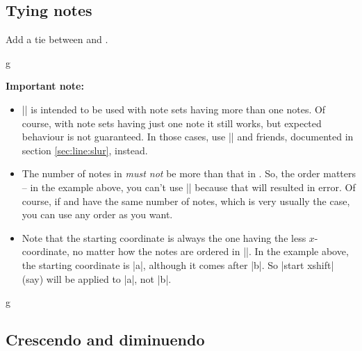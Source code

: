 \subsection{Tying notes}\label{sec:line:tie}
\begin{command}{\tmtie{}}
  Add a tie between  and .
\end{command}
\begin{codeexample}[]
\begin{tmline}
\begin{tmstaff}{g}{}
\end{tmstaff}
\end{tmline}
\end{codeexample}
{\bfseries\sffamily Important note:}
\begin{itemize}
  \item |\tmtie| is intended to be used with note sets having more than one notes. 
  Of course, with note sets having just one note it still works, but expected 
  behaviour is not guaranteed. In those cases, use |\tmslur| and friends, 
  documented in section \ref{sec:line:slur}, instead.
  \item The number of notes in  \emph{must not} be more than that in 
  . So, the order matters -- in the example above, you can't use 
  || because that will resulted in error. Of course, if  
  and  have the same number of notes, which is very usually the case, 
  you can use any order as you want.
  \item Note that the starting coordinate is always the one having the less 
  $x$-coordinate, no matter how the notes are ordered in |\tmtie|. In the example 
  above, the starting coordinate is |a|, although it comes after |b|. So 
  |start xshift| (say) will be applied to |a|, not |b|.
\end{itemize}
\begin{codeexample}[]
\begin{tmline}
\begin{tmstaff}{g}{}
\end{tmstaff}
\end{tmline}
\end{codeexample}
\subsection{Crescendo and diminuendo}\label{sec:line:cresc-dim}
